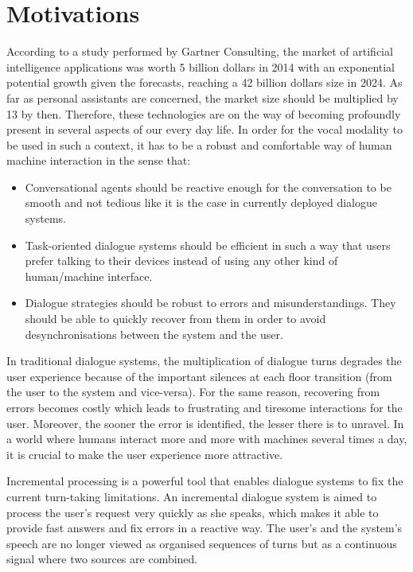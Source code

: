 \section*{Motivations}

				According to a study performed by Gartner Consulting, the market of artificial intelligence applications was worth 5 billion dollars in 2014 with an exponential potential growth given the forecasts, reaching a 42 billion dollars size in 2024. As far as personal assistants are concerned, the market size should be multiplied by 13 by then. Therefore, these technologies are on the way of becoming profoundly present in several aspects of our every day life. In order for the vocal modality to be used in such a context, it has to be a robust and comfortable way of human machine interaction in the sense that:
				
				\begin{itemize}
					\item Conversational agents should be reactive enough for the conversation to be smooth and not tedious like it is the case in currently deployed dialogue systems.
					\item Task-oriented dialogue systems should be efficient in such a way that users prefer talking to their devices instead of using any other kind of human/machine interface.
					\item Dialogue strategies should be robust to errors and misunderstandings. They should be able to quickly recover from them in order to avoid desynchronisations between the system and the user.
				\end{itemize}
				
				In traditional dialogue systems, the multiplication of dialogue turns degrades the user experience because of the important silences at each floor transition (from the user to the system and vice-versa). For the same reason, recovering from errors becomes costly which leads to frustrating and tiresome interactions for the user. Moreover, the sooner the error is identified, the lesser there is to unravel. In a world where humans interact more and more with machines several times a day, it is crucial to make the user experience more attractive.
				
				Incremental processing is a powerful tool that enables dialogue systems to fix the current turn-taking limitations. An incremental dialogue system is aimed to process the user's request very quickly as she speaks, which makes it able to provide fast answers and fix errors in a reactive way. The user's and the system's speech are no longer viewed as organised sequences of turns but as a continuous signal where two sources are combined.
				
